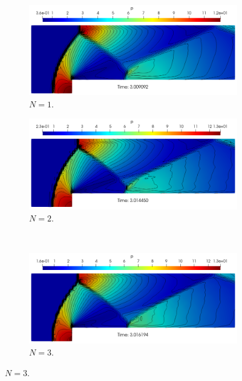 \documentclass[a4paper,11pt,oneside]{article}
\begin{document}
\begin{figure}[htbp]
	\centering
	\begin{subfigure}{0.5\linewidth}
		\includegraphics[width=\linewidth]{figures/forward_facing_step/res_40_N1_chandrashekhar_t3}
		\caption{$N=1$.}
		\label{subfig:forward_facing_step_result_N1}
	\end{subfigure}%
	\begin{subfigure}{0.5\linewidth}
		\includegraphics[width=\linewidth]{figures/forward_facing_step/res_40_N2_chandrashekhar_t3}
		\caption{$N=2$.}
		\label{subfig:forward_facing_step_result_N2}
	\end{subfigure}\\
	\begin{subfigure}{0.5\linewidth}
		\includegraphics[width=\linewidth]{figures/forward_facing_step/res_40_N3_chandrashekhar_t3}
		\caption{$N=3$.}

\end{subfigure}
\end{figure}
\end{document}

